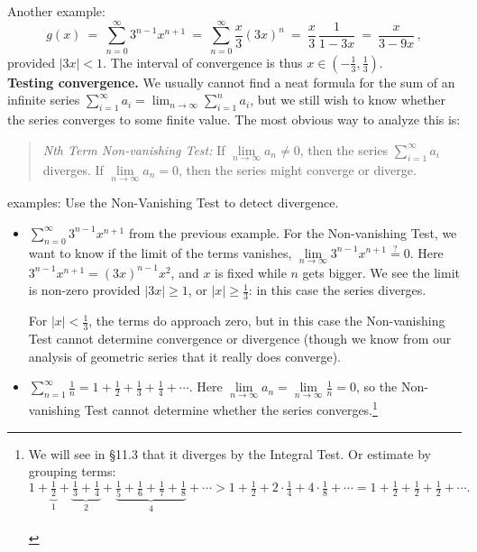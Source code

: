 \documentclass[11pt]{article}
\begin{document}
Another example:
$$
g(x) 
\ =\
\sum_{n=0}^\infty 3^{n-1}x^{n+1}
\ =\
\sum_{n=0}^\infty \frac{x}{3} (3x)^n
\ =\
\frac{x}{3}\,\frac{1}{1-3x} 
\ = \
\frac{x}{3-9x}\,,
$$
provided $|3x|<1$. The interval of convergence is thus $x\in(-\frac13,\frac13)$.
\\[1em]
{\bf Testing convergence.} We usually cannot find a neat formula for the
sum of an infinite series $\sum_{i=1}^\infty a_i=\lim_{n\to\infty}\sum_{i=1}^n a_i$,
but we still wish to know whether the series converges to some finite value. 
The most obvious way to analyze this is:
\begin{quote}
{\it Nth Term Non-vanishing Test:} 
If $\lim\limits_{n\to\infty} a_n \neq 0$, then the series $\sum_{i=1}^\infty a_i$ diverges. 
If $\lim\limits_{n\to\infty} a_n = 0$, then the series might converge or diverge.
\end{quote}
%
{\sc examples:} Use the Non-Vanishing Test to detect divergence.

\begin{itemize}

\item  $\sum_{n=0}^\infty 3^{n-1}x^{n+1}$ from the previous example.
For the Non-vanishing Test, we want to know if the limit of the terms vanishes,
$\lim\limits_{n\to\infty} 3^{n-1}x^{n+1} \stackrel{?}= 0$.
Here $3^{n-1}x^{n+1} = (3x)^{n-1}x^2$, and $x$ is fixed while $n$ gets bigger.
We see the limit is non-zero provided $|3x|\geq1$, or $|x|\geq\frac13$: in this case the series diverges.

For $|x|<\frac13$, the terms do approach zero, but in this case
the Non-vanishing Test cannot determine convergence or divergence  
(though we know from our analysis of geometric series that it really does converge).
 
\item $\sum_{n=1}^\infty \frac1n = 1 + \frac12 + \frac 13 +\frac14+\cdots$. 
Here $\lim\limits_{n\to\infty} a_n = \lim\limits_{n\to\infty} \frac1n = 0$, 
so the Non-vanishing Test 
cannot determine whether the series converges.\footnote{
We will see in \S11.3 that it diverges by the Integral Test.
Or estimate by grouping terms:
$$
1 + \underbrace{\tfrac12}_1 + \underbrace{\tfrac13 + \tfrac14}_2 + \underbrace{\tfrac15 + \tfrac16+\tfrac17+\tfrac18}_4 +\cdots
> 1 + \tfrac12 + 2\cdot\tfrac14 + 4\cdot\tfrac18 +\cdots=1+ \tfrac12+ \tfrac12+ \tfrac12+\cdots. 
$$
\\[-3em]
}

\end{itemize}
\end{document}
